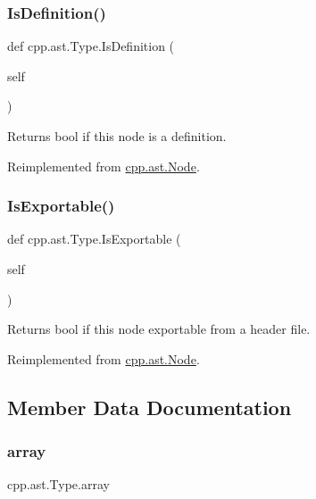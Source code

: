 \subsubsection{\texorpdfstring{IsDefinition()}{IsDefinition()}}
{\footnotesize\ttfamily def cpp.\+ast.\+Type.\+Is\+Definition (\begin{DoxyParamCaption}\item[{}]{self }\end{DoxyParamCaption})}

\begin{DoxyVerb}Returns bool if this node is a definition.\end{DoxyVerb}
 

Reimplemented from \mbox{\hyperlink{classcpp_1_1ast_1_1Node_a684ee9a357168e7e07a24fc6812f66e6}{cpp.\+ast.\+Node}}.

\mbox{\label{classcpp_1_1ast_1_1Type_a80dce781581c03e550ce51a9a33ca158}} 
\subsubsection{\texorpdfstring{IsExportable()}{IsExportable()}}
{\footnotesize\ttfamily def cpp.\+ast.\+Type.\+Is\+Exportable (\begin{DoxyParamCaption}\item[{}]{self }\end{DoxyParamCaption})}

\begin{DoxyVerb}Returns bool if this node exportable from a header file.\end{DoxyVerb}
 

Reimplemented from \mbox{\hyperlink{classcpp_1_1ast_1_1Node_a313273874ccf578485006d4000128234}{cpp.\+ast.\+Node}}.



\subsection{Member Data Documentation}
\mbox{\label{classcpp_1_1ast_1_1Type_a1fd0493e82da315bcb4c02b0cf2133a3}} 
\subsubsection{\texorpdfstring{array}{array}}
{\footnotesize\ttfamily cpp.\+ast.\+Type.\+array}

